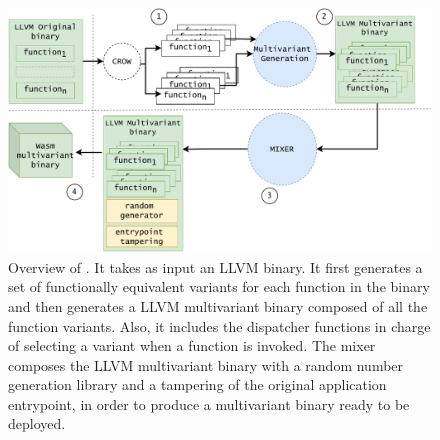 
\begin{figure}
  \centering
  \includegraphics[width=\linewidth]{diagrams/MEWE.pdf}
  \caption{Overview of \tool. It takes as input an LLVM binary. It first generates a set of functionally equivalent variants for each function in the binary and then generates a LLVM multivariant binary composed of all the function variants. Also, it includes the dispatcher functions in charge of selecting a variant when a function is invoked. The \tool mixer composes the LLVM multivariant binary with a random number generation library and a tampering of the original application entrypoint, in order to produce a \wasm multivariant binary ready to be deployed. }
  \label{workflow}
\end{figure}

